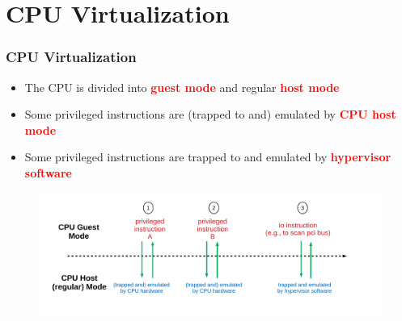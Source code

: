 \documentclass[aspectratio=169]{beamer}
\begin{document}

\section{CPU Virtualization}
\begin{frame}
\frametitle{CPU Virtualization}
\begin{itemize}
\item The CPU is divided into \textbf{\textcolor{red}{guest mode}} and regular \textbf{\textcolor{red}{host mode}}
\item Some privileged instructions are (trapped to and) emulated by \textbf{\textcolor{red}{CPU host mode}}
\item Some privileged instructions are trapped to and emulated by \textbf{\textcolor{red}{hypervisor software}}
\end{itemize}
\begin{figure}
\includegraphics[width=1.0\linewidth]{figures/cpu.pdf}
\end{figure}
\end{frame}

\end{document}
